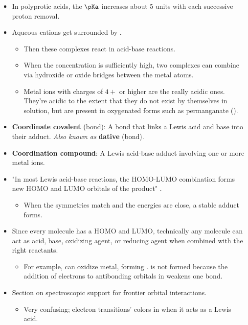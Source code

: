 \documentclass[../notes.tex]{subfiles}
\begin{document}
\begin{itemize}
    \item In polyprotic acids, the $\pKa$ increases about 5 units with each successive proton removal.
    \item Aqueous cations get surrounded by .
    \begin{itemize}
        \item Then these complexes react in acid-base reactions.
        \item When the concentration is sufficiently high, two complexes can combine via hydroxide or oxide bridges between the metal atoms.
        \item Metal ions with charges of $4+$ or higher are the really acidic ones. They're acidic to the extent that they do not exist by themselves in solution, but are present in oxygenated forms such as permanganate ().
    \end{itemize}
    \item \textbf{Coordinate covalent} (bond): A bond that links a Lewis acid and base into their adduct. \emph{Also known as} \textbf{dative} (bond).
    \item \textbf{Coordination compound}: A Lewis acid-base adduct involving one or more metal ions.
    \item "In most Lewis acid-base reactions, the HOMO-LUMO combination forms new HOMO and LUMO orbitals of the product" \parencite[186]{bib:MiesslerFischerTarr}.
    \begin{itemize}
        \item When the symmetries match and the energies are close, a stable adduct forms.
    \end{itemize}
    \item Since every molecule has a HOMO and LUMO, technically any molecule can act as acid, base, oxidizing agent, or reducing agent when combined with the right reactants.
    \begin{itemize}
        \item For example,  can oxidize  metal, forming .  is not formed because the addition of electrons to antibonding orbitals in  weakens one  bond.
    \end{itemize}
    \item {}Section on spectroscopic support for frontier orbital interactions.
    \begin{itemize}
        \item Very confusing; electron transitions' colors in  when it acts as a Lewis acid.

\end{itemize}
\end{itemize}
\end{document}
